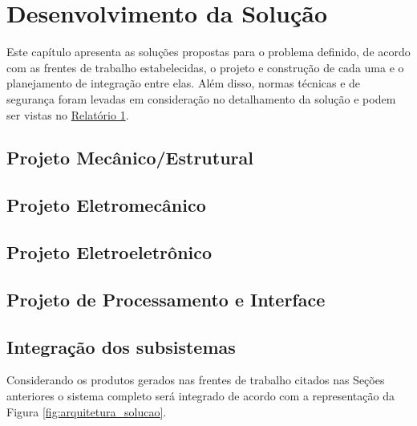 \chapter{Desenvolvimento da Solução}
\label{desenvolvimento}

Este capítulo apresenta as soluções propostas para o problema definido, de acordo com as frentes de trabalho estabelecidas, o projeto
e construção de cada uma e o planejamento de integração entre elas.
Além disso, normas técnicas e de segurança foram levadas em consideração no detalhamento da solução e podem ser vistas no
\href{https://drive.google.com/file/d/0B5InkGKx6O-MR1B3eVYzZFpjQ3c/view?usp=sharing}{Relatório 1}.

\section{Projeto Mecânico/Estrutural}



\section{Projeto Eletromecânico}



\section{Projeto Eletroeletrônico}



\section{Projeto de Processamento e Interface}



\section{Integração dos subsistemas}

Considerando os produtos gerados nas frentes de trabalho citados nas Seções anteriores o sistema completo será integrado de acordo com
a representação da Figura \ref{fig:arquitetura_solucao}.

